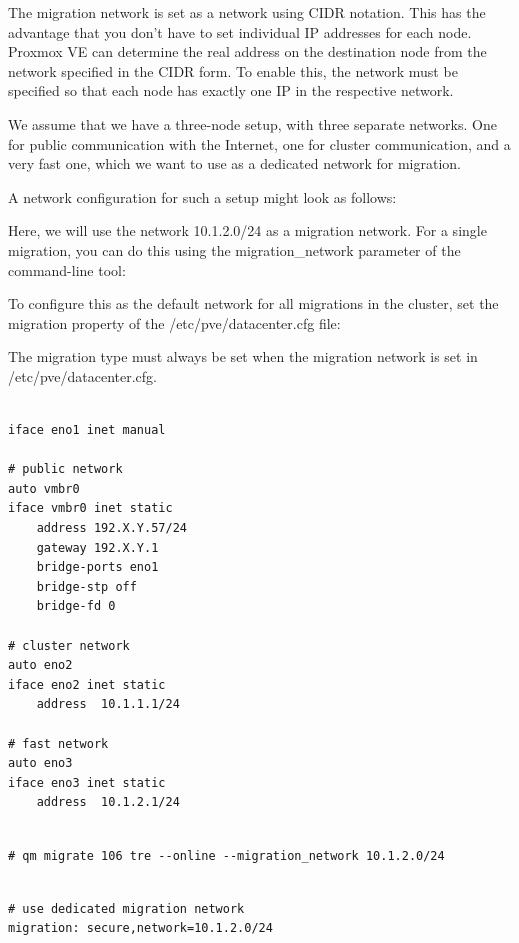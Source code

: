 The migration network is set as a network using CIDR notation. This has the advantage that you don’t have to set individual IP addresses for each node. Proxmox VE can determine the real address on the destination node from the network specified in the CIDR form. To enable this, the network must be specified so that each node has exactly one IP in the respective network.

We assume that we have a three-node setup, with three separate networks. One for public communication with the Internet, one for cluster communication, and a very fast one, which we want to use as a dedicated network for migration.

A network configuration for such a setup might look as follows:

Here, we will use the network 10.1.2.0/24 as a migration network. For a single migration, you can do this using the migration_network parameter of the command-line tool:

To configure this as the default network for all migrations in the cluster, set the migration property of the /etc/pve/datacenter.cfg file:

The migration type must always be set when the migration network is set in /etc/pve/datacenter.cfg.

\begin{lstlisting}

iface eno1 inet manual

# public network
auto vmbr0
iface vmbr0 inet static
    address 192.X.Y.57/24
    gateway 192.X.Y.1
    bridge-ports eno1
    bridge-stp off
    bridge-fd 0

# cluster network
auto eno2
iface eno2 inet static
    address  10.1.1.1/24

# fast network
auto eno3
iface eno3 inet static
    address  10.1.2.1/24

\end{lstlisting}

\begin{lstlisting}

# qm migrate 106 tre --online --migration_network 10.1.2.0/24

\end{lstlisting}

\begin{lstlisting}

# use dedicated migration network
migration: secure,network=10.1.2.0/24

\end{lstlisting}


